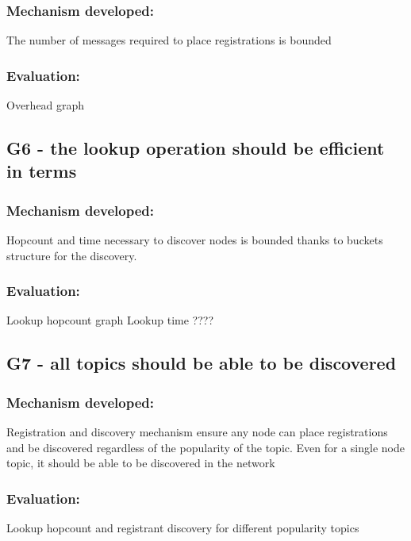 \subsubsection{Mechanism developed:} 

The number of messages required to place registrations is bounded

\subsubsection{Evaluation: }

Overhead graph

\subsection{G6 - the lookup operation should be efficient in terms }

\subsubsection{Mechanism developed:} 

Hopcount and time necessary to discover nodes is bounded thanks to buckets structure for the discovery.

\subsubsection{Evaluation: }

Lookup hopcount graph
Lookup time ???? 

\subsection{G7 - all topics should be able to be discovered}

\subsubsection{Mechanism developed:} 

Registration and discovery mechanism ensure any node can place registrations and be discovered regardless of the popularity of the topic. 
Even for a single node topic, it should be able to be discovered in the network 

\subsubsection{Evaluation: }

Lookup hopcount and registrant discovery 
for different popularity topics

